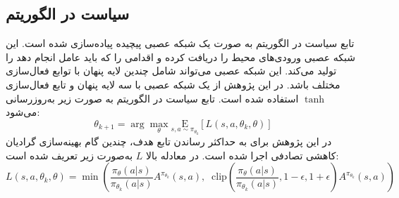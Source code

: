 \subsection{
    سیاست در الگوریتم 
}
تابع سیاست در الگوریتم  به صورت یک شبکه عصبی پیچیده پیاده‌سازی شده است. این شبکه عصبی ورودی‌های محیط را دریافت کرده و اقدامی را که باید عامل انجام دهد را تولید می‌کند. این شبکه عصبی می‌تواند شامل چندین لایه پنهان با توابع فعال‌سازی مختلف باشد. در این پژوهش از یک شبکه عصبی با سه لایه پنهان و تابع فعال‌سازی 
\(\tanh\)
استفاده شده است.
تابع سیاست در الگوریتم  به صورت زیر به‌روز‌رسانی می‌شود:
\begin{equation}
    \theta_{k+1} = \arg \max_{\theta} \underset{s,a \sim \pi_{\theta_k}}{{\mathrm E}}\left[
        L(s,a,\theta_k, \theta)\right]
\end{equation}
در این پژوهش برای به حداکثر رساندن تابع هدف، چندین گام بهینه‌سازی 
گرادیان کاهشی تصادفی
اجرا شده است.
در معادله بالا
\(L\)
به‌صورت زیر تعریف شده است:
\begin{equation}
    L(s,a,\theta_k,\theta) = \min\left(
    \frac{\pi_{\theta}(a|s)}{\pi_{\theta_k}(a|s)}  A^{\pi_{\theta_k}}(s,a), \;\;
    \text{clip}\left(\frac{\pi_{\theta}(a|s)}{\pi_{\theta_k}(a|s)}, 1 - \epsilon, 1+\epsilon \right) A^{\pi_{\theta_k}}(s,a)
    \right)
\end{equation}
